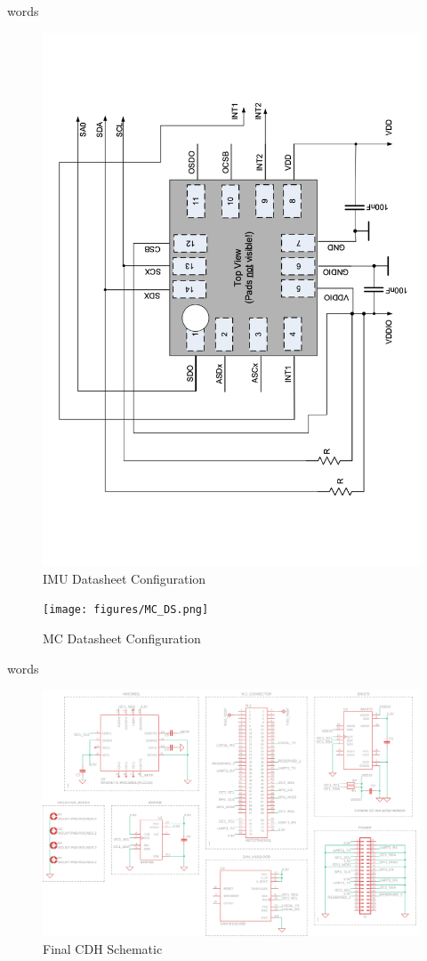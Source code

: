 \documentclass{report}
\begin{document}
            words
            \begin{figure}[H]
                \centering
                \includegraphics[width=0.5\linewidth, angle=270]{figures/IMU_DS.pdf}
                \caption{IMU Datasheet Configuration}
                \label{fig:imu_ds}
            \end{figure}

            \begin{figure}[H]
                \centering
                \texttt{[image: figures/MC\_DS.png]}
                \caption{MC Datasheet Configuration}
                \label{fig:mc_ds}
            \end{figure}
    



            words
            \begin{figure}[H]
                \centering
                \includegraphics[width=0.8\linewidth]{figures/CDH_SCHM.png}
                \caption{Final CDH Schematic}
                \label{fig:cdh_schm}
            \end{figure}
\end{document}
